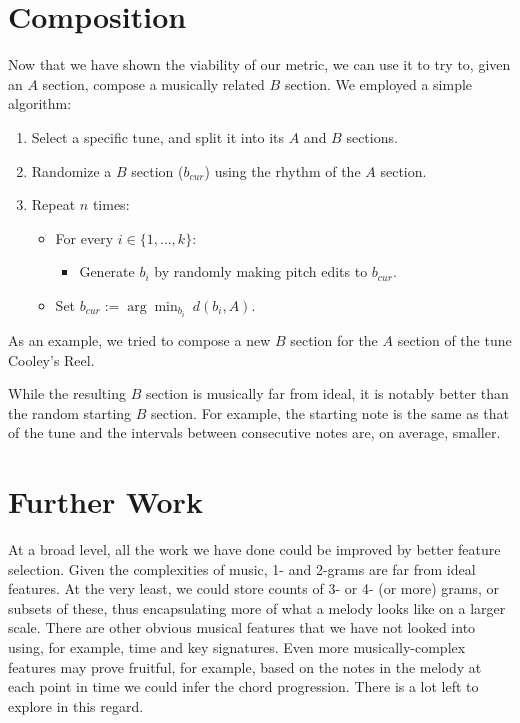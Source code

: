 \documentclass{article} %
\begin{document}
\section{Composition}
Now that we have shown the viability of our metric, we can use it to try to,
given an $A$ section, compose a musically related $B$ section. We employed a
simple algorithm:
\begin{enumerate}
\item Select a specific tune, and split it into its $A$ and $B$ sections.

\item Randomize a $B$ section ($b_{cur}$) using the rhythm of the $A$ section.

\item Repeat $n$ times:
\begin{itemize}\parskip=0.05in
\item[] For every $i \in \{1, \dots, k\}$:
\begin{itemize}
\item[] Generate $b_i$ by randomly making pitch edits to $b_{cur}$.
\end{itemize}
\item[] Set
$\displaystyle{b_{cur} := \arg \min_{b_i} \  d(b_i, A)}$.
\end{itemize}
\end{enumerate}
As an example, we tried to compose a new $B$ section for the $A$ section of the
tune Cooley's Reel. %

While the resulting $B$ section is musically far from ideal, it is notably
better than the random starting $B$ section. For example, the starting note is
the same as that of the tune and the intervals between consecutive notes are, on
average, smaller.

\section{Further Work}
At a broad level, all the work we have done could be improved by better feature
selection. Given the complexities of music, 1- and 2-grams are far from ideal
features. At the very least, we could store counts of 3- or 4- (or more) grams,
or subsets of these, thus encapsulating more of what a melody looks like on a
larger scale. There are other obvious musical features that we have not looked
into using, for example, time and key signatures. Even more musically-complex
features may prove fruitful, for example, based on the notes in the melody at
each point in time we could infer the chord progression. There is a lot left
to explore in this regard.
\end{document}
